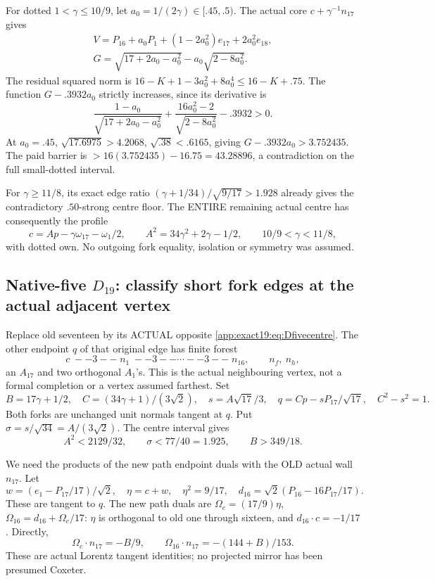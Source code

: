 \documentclass[11pt]{article}
\theoremstyle{definition}
\theoremstyle{remark}
\begin{document}
For dotted \(1<\gamma\le10/9\),
let \(a_0=1/(2\gamma)\in[.45,.5)\).
The actual core
\(c+\gamma^{-1}n_{17}\) gives
\[
 \begin{gathered}
 V=P_{16}+a_0P_1+(1-2a_0^2)e_{17}+2a_0^2e_{18},\\
 G=\sqrt{17+2a_0-a_0^2}-a_0\sqrt{2-8a_0^2}.
 \end{gathered}
\]
The residual squared norm is
\(16-K+1-3a_0^2+8a_0^4\le16-K+.75\).
The function \(G-.3932a_0\)
strictly increases, since its
derivative is
\[
 \frac{1-a_0}{\sqrt{17+2a_0-a_0^2}}
       +\frac{16a_0^2-2}{\sqrt{2-8a_0^2}}-.3932>0 .
\]
At \(a_0=.45\),
\(\sqrt{17.6975}>4.2068\),
\(\sqrt{.38}<.6165\), giving
\(G-.3932a_0>3.752435\).
The paid barrier is
\(>16(3.752435)-16.75=43.28896\),
a contradiction on the full
small-dotted interval.

For \(\gamma\ge11/8\), its exact
edge ratio
\((\gamma+1/34)/\sqrt{9/17}>1.928\)
already gives the contradictory
\(.50\)-strong centre floor.
The ENTIRE remaining actual
centre has consequently the
profile
\[
 c=Ap-\gamma\omega_{17}-\omega_1/2,\qquad
 A^2=34\gamma^2+2\gamma-1/2,\qquad
                              10/9<\gamma<11/8 ,
\tag{D19fivecentre}\label{app:exact19:eq:Dfivecentre}
\]
with dotted own.
No outgoing fork equality,
isolation or symmetry was
assumed.


\subsection{Native-five \(D_{19}\): classify short fork edges at the actual adjacent vertex}
\label{app:exact19:Dfiveq}

Replace old seventeen by its
ACTUAL opposite
\eqref{app:exact19:eq:Dfivecentre}.
The other endpoint \(q\) of that
original edge has finite forest
\[
                   c\;--3--\;n_1\;--3--\cdots--3--\;n_{16},
                     \qquad n_f,\ n_h ,
\]
an \(A_{17}\) and two orthogonal
\(A_1\)'s.
This is the actual neighbouring
vertex, not a formal completion
or a vertex assumed farthest.
Set
\[
 B=17\gamma+1/2,\quad
 C=(34\gamma+1)/(3\sqrt2),\quad
 s=A\sqrt{17}/3,\quad
                   q=Cp-sP_{17}/\sqrt{17},\quad C^2-s^2=1 .
\]
Both forks are unchanged unit
normals tangent at \(q\).
Put \(\sigma=s/\sqrt{34}=A/(3\sqrt2)\).
The centre interval gives
\[
                 A^2<2129/32,\qquad \sigma<77/40=1.925,
                                  \qquad B>349/18 .
\]

We need the products of the new
path endpoint duals with the OLD
actual wall \(n_{17}\).
Let
\[
 w=(e_1-P_{17}/17)/\sqrt2,\quad
 \eta=c+w,\quad\eta^2=9/17,\quad
 d_{16}=\sqrt2(P_{16}-16P_{17}/17).
\]
These are tangent to \(q\).
The new path duals are
\(\Omega_c=(17/9)\eta\),
\(\Omega_{16}=d_{16}+\Omega_c/17\):
\(\eta\) is orthogonal to old
one through sixteen, and
\(d_{16}\cdot c=-1/17\).
Directly,
\[
                 \Omega_c\cdot n_{17}=-B/9,\qquad
                 \Omega_{16}\cdot n_{17}=-(144+B)/153 .
\tag{D19qduals}\label{app:exact19:eq:Dqduals}
\]
These are actual Lorentz tangent
identities; no projected mirror
has been presumed Coxeter.
\end{document}
